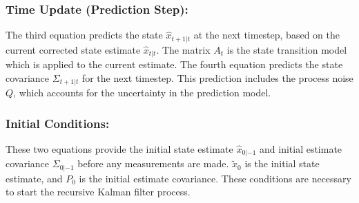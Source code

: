 \documentclass{report}
\begin{document}
  \subsubsection*{Time Update (Prediction Step):}
  The third equation predicts the state $\hat{x}_{t+1|t}$ at the next timestep,
   based on the current corrected state estimate $\hat{x}_{t|t}$. The matrix
   $A_t$ is the state transition model which is applied to the current estimate.
   The fourth equation predicts the state covariance $\Sigma_{t+1|t}$ for the
   next timestep. This prediction includes the process noise $Q$, which accounts
   for the uncertainty in the prediction model.

  \subsubsection*{Initial Conditions:}
  These two equations provide the initial state estimate $\hat{x}_{0|-1}$ and
  initial estimate covariance $\Sigma_{0|-1}$ before any measurements are made.
  $\tilde{x}_0$ is the initial state estimate, and $P_0$ is the initial estimate
  covariance. These conditions are necessary to start the recursive Kalman
  filter process.
\end{document}
